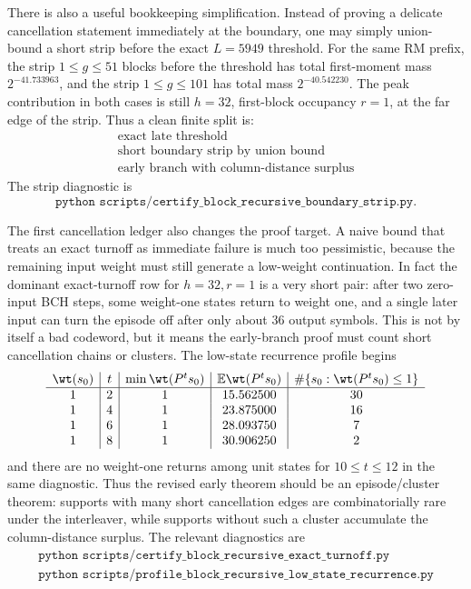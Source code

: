 There is also a useful bookkeeping simplification.  Instead of proving a delicate cancellation statement immediately at
the boundary, one may simply union-bound a short strip before the exact \(L=5949\) threshold.  For the same RM prefix,
the strip \(1\le g\le 51\) blocks before the threshold has total first-moment mass \(2^{-41.733963}\), and the strip
\(1\le g\le 101\) has total mass \(2^{-40.542230}\).  The peak contribution in both cases is still \(h=32\),
first-block occupancy \(r=1\), at the far edge of the strip.  Thus a clean finite split is:
\[
\begin{array}{c}
\text{exact late threshold}\\
\text{short boundary strip by union bound}\\
\text{early branch with column-distance surplus}
\end{array}
\]
The strip diagnostic is
\[
\texttt{python scripts/certify\_block\_recursive\_boundary\_strip.py}.
\]

The first cancellation ledger also changes the proof target.  A naive bound that treats an exact turnoff as immediate
failure is much too pessimistic, because the remaining input weight must still generate a low-weight continuation.  In
fact the dominant exact-turnoff row for \(h=32,r=1\) is a very short pair: after two zero-input BCH steps, some
weight-one states return to weight one, and a single later input can turn the episode off after only about \(36\)
output symbols.  This is not by itself a bad codeword, but it means the early-branch proof must count short
cancellation chains or clusters.  The low-state recurrence profile begins
\[
\begin{array}{c|c|c|c|c}
\wt(s_0) & t & \min \wt(P^t s_0) & \mathbb{E}\wt(P^t s_0) &
\#\{s_0:\wt(P^t s_0)\le 1\}\\
\hline
1&2&1&15.562500&30\\
1&4&1&23.875000&16\\
1&6&1&28.093750&7\\
1&8&1&30.906250&2
\end{array}
\]
and there are no weight-one returns among unit states for \(10\le t\le 12\) in the same diagnostic.  Thus the revised
early theorem should be an episode/cluster theorem: supports with many short cancellation edges are combinatorially
rare under the interleaver, while supports without such a cluster accumulate the column-distance surplus.  The relevant
diagnostics are
\[
\begin{array}{c}
\texttt{python scripts/certify\_block\_recursive\_exact\_turnoff.py}\\
\texttt{python scripts/profile\_block\_recursive\_low\_state\_recurrence.py}
\end{array}
\]


